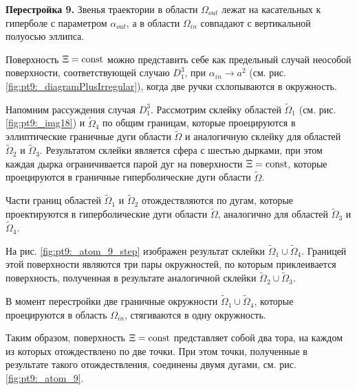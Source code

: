 \textbf{Перестройка 9.}
Звенья траектории в области $\Omega_{out}$ лежат на касательных к гиперболе с параметром $\alpha_{out}$, а в области $\Omega_{in}$ совпадают с вертикальной полуосью эллипса.

Поверхность $\Xi = \mathrm{const}$ можно представить себе как предельный случай неособой поверхности, соответствующей случаю $D_1^3$, при $\alpha_{in} \to a^2$ (см. рис. \ref{fig:pt9:_diagramPlusIrregular}), когда две ручки схлопываются в окружность.

Напомним рассуждения случая $D_1^3$. Рассмотрим склейку областей  $\widetilde{\Omega}_1$ (см. рис. \ref{fig:pt9:_img18}) и $\widetilde{\Omega}_4$  по общим границам, которые проецируются в эллиптические граничные дуги области $\widetilde{\Omega}$ и аналогичную склейку для областей $\widetilde{\Omega}_2$ и $\widetilde{\Omega}_3$.
Результатом склейки является сфера с шестью дырками, при этом каждая дырка ограничивается парой дуг на поверхности $\Xi=\mathrm{const}$, которые проецируются в граничные гиперболические дуги области $\widetilde{\Omega}$. 

Части границ областей $\widetilde{\Omega}_1$ и $\widetilde{\Omega}_2$ отождествляются по дугам, которые проектируются в гиперболические дуги области $\widetilde{\Omega}$, аналогично для областей $\widetilde{\Omega}_3$ и $\widetilde{\Omega}_4$.

На рис. \ref{fig:pt9:_atom_9_step} изображен результат склейки $\widetilde{\Omega}_1 \cup \widetilde{\Omega}_4$. Границей этой поверхности являются три пары окружностей, по которым приклеивается поверхность, полученная в результате аналогичной  склейки  $\widetilde{\Omega}_2 \cup \widetilde{\Omega}_3$. 

В момент перестройки две граничные окружности $\widetilde{\Omega}_1 \cup \widetilde{\Omega}_4$, которые проецируются в область $\Omega_{in}$, стягиваются в одну окружность.

Таким образом, поверхность $\Xi = \mathrm{const}$ представляет собой два тора, на каждом из которых отождествлено по две точки. При этом точки, полученные в результате такого отождествления, соединены двумя дугами, см. рис. \ref{fig:pt9:_atom_9}.
%
%

